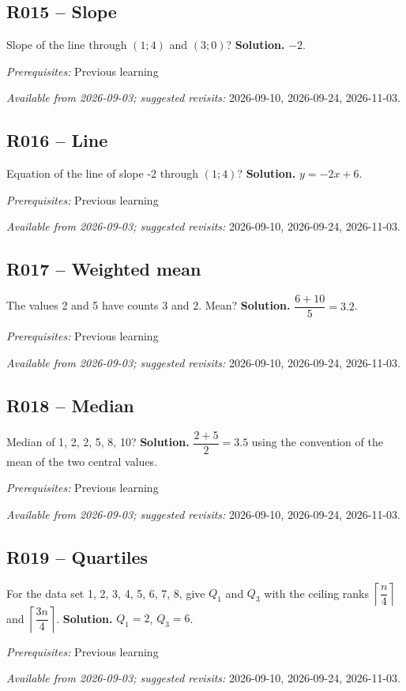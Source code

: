 \subsection*{R015 -- Slope}\label{R015}
Slope of the line through $(1;4)$ and $(3;0)$?
\ifprof\textbf{Solution.} $-2$.\par\textit{Prerequisites:} Previous learning\par\textit{Available from 2026-09-03; suggested revisits:} 2026-09-10, 2026-09-24, 2026-11-03.\fi
{}\subsection*{R016 -- Line}\label{R016}
Equation of the line of slope -2 through $(1;4)$?
\ifprof\textbf{Solution.} $y=-2x+6$.\par\textit{Prerequisites:} Previous learning\par\textit{Available from 2026-09-03; suggested revisits:} 2026-09-10, 2026-09-24, 2026-11-03.\fi
{}\subsection*{R017 -- Weighted mean}\label{R017}
The values 2 and 5 have counts 3 and 2. Mean?
\ifprof\textbf{Solution.} $\dfrac{6+10}{5}=3.2$.\par\textit{Prerequisites:} Previous learning\par\textit{Available from 2026-09-03; suggested revisits:} 2026-09-10, 2026-09-24, 2026-11-03.\fi
{}\subsection*{R018 -- Median}\label{R018}
Median of 1, 2, 2, 5, 8, 10?
\ifprof\textbf{Solution.} $\dfrac{2+5}{2}=3.5$ using the convention of the mean of the two central values.\par\textit{Prerequisites:} Previous learning\par\textit{Available from 2026-09-03; suggested revisits:} 2026-09-10, 2026-09-24, 2026-11-03.\fi
{}\subsection*{R019 -- Quartiles}\label{R019}
For the data set 1, 2, 3, 4, 5, 6, 7, 8, give $Q_1$ and $Q_3$ with the ceiling ranks $\left\lceil\dfrac n4\right\rceil$ and $\left\lceil\dfrac{3n}4\right\rceil$.
\ifprof\textbf{Solution.} $Q_1=2$, $Q_3=6$.\par\textit{Prerequisites:} Previous learning\par\textit{Available from 2026-09-03; suggested revisits:} 2026-09-10, 2026-09-24, 2026-11-03.\fi
